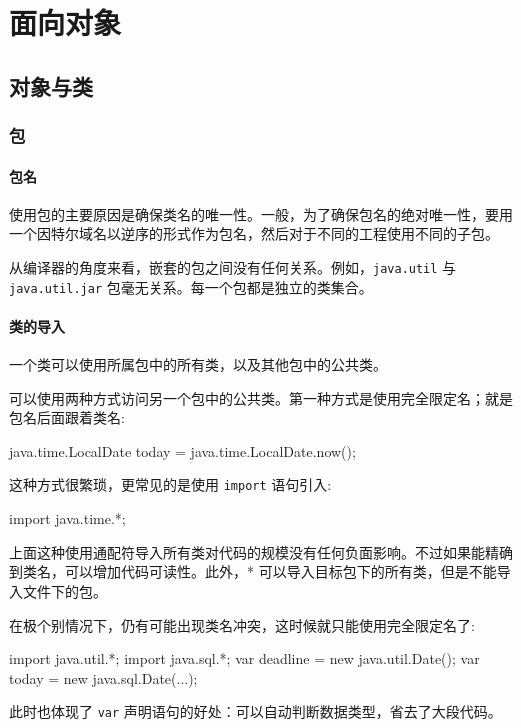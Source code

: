 \chapter{面向对象}
\section{对象与类}
\subsection{包}
\subsubsection{包名}

使用包的主要原因是确保类名的唯一性。一般，为了确保包名的绝对唯一性，要用一个因特尔域名以逆序的形式作为包名，然后对于不同的工程使用不同的子包。

从编译器的角度来看，嵌套的包之间没有任何关系。例如，\texttt{java.util} 与 \texttt{java.util.jar} 包毫无关系。每一个包都是独立的类集合。

\subsubsection{类的导入}

一个类可以使用所属包中的所有类，以及其他包中的公共类。

可以使用两种方式访问另一个包中的公共类。第一种方式是使用完全限定名；就是包名后面跟着类名:

\begin{Java}
java.time.LocalDate today = java.time.LocalDate.now();
\end{Java}

这种方式很繁琐，更常见的是使用 \texttt{import} 语句引入:

\begin{Java}
import java.time.*;
\end{Java}

上面这种使用通配符导入所有类对代码的规模没有任何负面影响。不过如果能精确到类名，可以增加代码可读性。此外，* 可以导入目标包下的所有类，但是不能导入文件下的包。

在极个别情况下，仍有可能出现类名冲突，这时候就只能使用完全限定名了:

\begin{Java}
import java.util.*;
import java.sql.*;
var deadline = new java.util.Date();
var today = new java.sql.Date(...);
\end{Java}

此时也体现了 \texttt{var} 声明语句的好处：可以自动判断数据类型，省去了大段代码。

